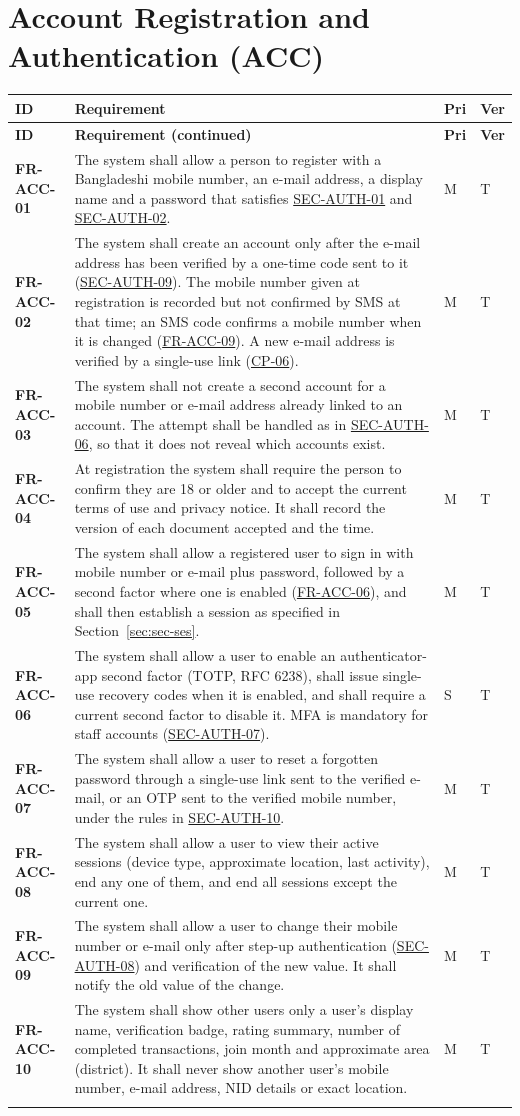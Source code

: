 \documentclass[11pt,a4paper]{report}
\makeatletter
\newenvironment{reqs}{%
  \small
  \begin{longtable}{@{}>{\raggedright\arraybackslash}p{2.35cm}
                       >{\raggedright\arraybackslash}p{10.3cm}
                       >{\centering\arraybackslash}p{0.7cm}
                       >{\centering\arraybackslash}p{0.7cm}@{}}
  \toprule
  \textbf{ID} & \textbf{Requirement} & \textbf{Pri} & \textbf{Ver} \\
  \midrule
  \endfirsthead
  \toprule
  \textbf{ID} & \textbf{Requirement (continued)} & \textbf{Pri} & \textbf{Ver} \\
  \midrule
  \endhead
  \bottomrule
  \endfoot
}{\end{longtable}}
\newcommand{\req}[5]{\leavevmode\textbf{#1}\hypertarget{#1}{} & #5 & #2 & #3 \\ \addlinespace[2pt]}
\newcommand{\rr}[1]{\hyperlink{#1}{#1}}
\newcommand{\cp}[1]{\hyperlink{#1}{#1}}
\makeatother
\begin{document}
\section{Account Registration and Authentication (ACC)}
\begin{reqs}
\req{FR-ACC-01}{M}{T}{FR-1}{The system shall allow a person to register with a Bangladeshi mobile number, an e-mail address, a display name and a password that satisfies \rr{SEC-AUTH-01} and \rr{SEC-AUTH-02}.}
\req{FR-ACC-02}{M}{T}{new}{The system shall create an account only after the e-mail address has been verified by a one-time code sent to it (\rr{SEC-AUTH-09}). The mobile number given at registration is recorded but not confirmed by SMS at that time; an SMS code confirms a mobile number when it is changed (\rr{FR-ACC-09}). A new e-mail address is verified by a single-use link (\cp{CP-06}).}
\req{FR-ACC-03}{M}{T}{new}{The system shall not create a second account for a mobile number or e-mail address already linked to an account. The attempt shall be handled as in \rr{SEC-AUTH-06}, so that it does not reveal which accounts exist.}
\req{FR-ACC-04}{M}{T}{new}{At registration the system shall require the person to confirm they are 18 or older and to accept the current terms of use and privacy notice. It shall record the version of each document accepted and the time.}
\req{FR-ACC-05}{M}{T}{FR-3}{The system shall allow a registered user to sign in with mobile number or e-mail plus password, followed by a second factor where one is enabled (\rr{FR-ACC-06}), and shall then establish a session as specified in Section~\ref{sec:sec-ses}.}
\req{FR-ACC-06}{S}{T}{new}{The system shall allow a user to enable an authenticator-app second factor (TOTP, RFC 6238), shall issue single-use recovery codes when it is enabled, and shall require a current second factor to disable it. MFA is mandatory for staff accounts (\rr{SEC-AUTH-07}).}
\req{FR-ACC-07}{M}{T}{new}{The system shall allow a user to reset a forgotten password through a single-use link sent to the verified e-mail, or an OTP sent to the verified mobile number, under the rules in \rr{SEC-AUTH-10}.}
\req{FR-ACC-08}{M}{T}{new}{The system shall allow a user to view their active sessions (device type, approximate location, last activity), end any one of them, and end all sessions except the current one.}
\req{FR-ACC-09}{M}{T}{new}{The system shall allow a user to change their mobile number or e-mail only after step-up authentication (\rr{SEC-AUTH-08}) and verification of the new value. It shall notify the old value of the change.}
\req{FR-ACC-10}{M}{T}{new}{The system shall show other users only a user's display name, verification badge, rating summary, number of completed transactions, join month and approximate area (district). It shall never show another user's mobile number, e-mail address, NID details or exact location.}

\end{reqs}
\end{document}
